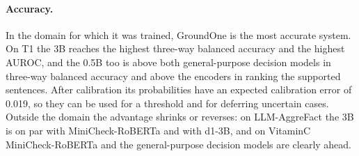 \paragraph{Accuracy.} In the domain for which it was trained, GroundOne is the most accurate system. On T1 the 3B
reaches the highest three-way balanced accuracy and the highest AUROC, and the 0.5B too is above both general-purpose
decision models in three-way balanced accuracy and above the encoders in ranking the supported sentences. After
calibration its probabilities have an expected calibration error of 0.019, so they can be used for a threshold and
for deferring uncertain cases. Outside the domain the advantage shrinks or reverses: on LLM-AggreFact the 3B is on
par with MiniCheck-RoBERTa and with d1-3B, and on VitaminC MiniCheck-RoBERTa and the general-purpose decision models are clearly ahead.

